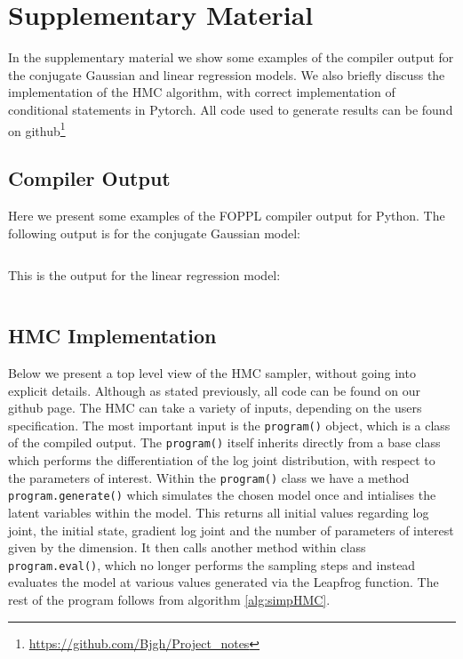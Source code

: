 \documentclass[twoside]{article}
\begin{document}
\section{Supplementary Material}
\label{sec:supmat}

In the supplementary material we show some examples of the compiler output for the conjugate Gaussian and linear regression models. We also briefly discuss the implementation of the HMC algorithm, with correct implementation of conditional statements in Pytorch.  All code used to generate results can be found on github\footnote{\url{https://github.com/Bjgh/Project_notes}}\\

\subsection{Compiler Output}
Here we present some examples of the FOPPL compiler output for Python. 
The following output is for the conjugate Gaussian model:  
\inputminted{python}{code/cjgauss.py}
This is the output for the linear regression model:
\inputminted{python}{code/lr_out.py}

\subsection{HMC Implementation}

Below we present a top level view of the HMC sampler, without going into explicit details. Although as stated previously, all code can be found on our github page. The HMC can take a variety of inputs, depending on the users specification. The most important input is the \texttt{program()} object, which is a class of the compiled output. The \texttt{program()} itself inherits directly from a base class which performs the differentiation of the log joint distribution, with respect to the parameters of interest. Within the \texttt{program()} class we have a method \texttt{program.generate()} which simulates the chosen model once and intialises the latent variables within the model. This returns all initial values regarding log joint, the initial state, gradient log joint and the number of parameters of interest given by the dimension. It then calls another method within class \texttt{program.eval()}, which no longer performs the sampling steps and instead evaluates the model at various values generated via the Leapfrog function. The rest of the program follows from algorithm \ref{alg:simpHMC}.
 
\end{document}
